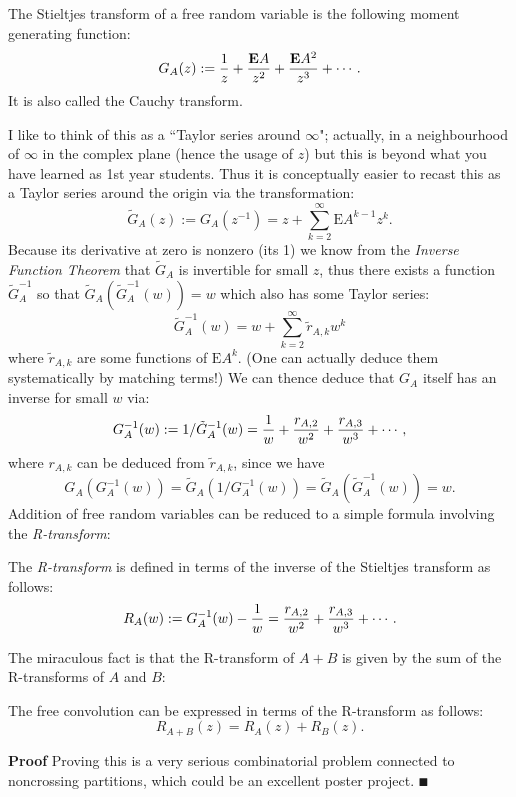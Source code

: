 \begin{definition} The Stieltjes transform of a free random variable is the following moment generating function:
\[
G_A(z) := {1 \over z} + {\ensuremath{\bm{\mathrm{E}}} A \over z^2} + {\ensuremath{\bm{\mathrm{E}}} A^2  \over z^3} + \ensuremath{\cdots}.
\]
It is also called the Cauchy transform. \end{definition}

I like to think of this as a ``Taylor series around \ensuremath{\infty}"; actually, in a neighbourhood of \ensuremath{\infty} in the complex plane (hence the usage of $z$) but this is beyond what you have learned as 1st year students. Thus it is conceptually easier to recast this as a Taylor series around the origin via the transformation:
\[
\tilde{G}_A(z) := G_A(z^{-1}) = z + \ensuremath{\sum}_{k=2}^\ensuremath{\infty} \ensuremath{\bm{\mathrm{E}}} A^{k-1} z^k.
\]
Because its derivative at zero is nonzero (its 1) we know from the \emph{Inverse Function Theorem} that $\tilde{G}_A$ is invertible for small $z$, thus there exists a function $\tilde{G}_A^{-1}$ so that $\tilde{G}_A(\tilde{G}_A^{-1}(w)) = w$    which also has some Taylor series:
\[
\tilde{G}_A^{-1}(w) = w + \ensuremath{\sum}_{k=2}^\ensuremath{\infty} \tilde{r}_{A,k} w^k
\]
where $\tilde{r}_{A,k}$ are some functions of $\ensuremath{\bm{\mathrm{E}}} A^k$.  (One can actually deduce them systematically by matching terms!) We can thence deduce that $G_A$ itself has an inverse for small $w$ via:
\[
G_A^{-1}(w) := 1/\tilde{G}_A^{-1}(w) = {1 \over w} + {r_{A,2} \over w^2} + {r_{A,3} \over w^3} + \ensuremath{\cdots},
\]
where $r_{A,k}$ can be deduced from $\tilde{r}_{A,k}$, since we have 
\[
G_A(G_A^{-1}(w)) = \tilde{G}_A(1/G_A^{-1}(w)) = \tilde{G}_A(\tilde{G}_A^{-1}(w)) = w.
\]
Addition of free random variables can be reduced to a simple formula involving the \emph{R-transform}:

\begin{definition}[R-transform] The \emph{R-transform} is defined in terms of the inverse of the Stieltjes transform as follows:
\[
R_A(w) := G_A^{-1}(w) - {1 \over w} = {r_{A,2} \over w^2} + {r_{A,3} \over w^3} + \ensuremath{\cdots}.
\]
\end{definition}

The miraculous fact is that the R-transform of $A+B$ is given by the sum of the R-transforms of $A$ and $B$:

\begin{theorem} The free convolution can be expressed in terms of the R-transform as follows:
\[
R_{A+B}(z) = R_A(z) + R_B(z).
\]
\end{theorem}
\textbf{Proof} Proving this is a very serious combinatorial problem connected to noncrossing partitions, which could be an excellent poster project. \ensuremath{\QED} 

